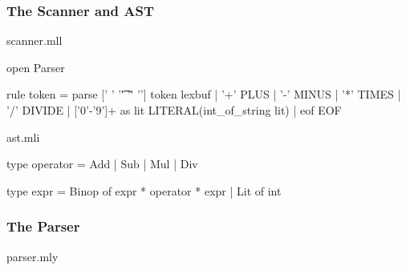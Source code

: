 \documentclass{plt}
\begin{document}
\begin{frame}[fragile]
  \frametitle{The Scanner and AST}
scanner.mll

\vspace{4pt}

\begin{ocamllex}
{ open Parser }

rule token =
  parse [' ' '\t' '\r' '\n'] { token lexbuf }
      | '+'                  { PLUS }
      | '-'                  { MINUS }
      | '*'                  { TIMES }
      | '/'                  { DIVIDE }
      | ['0'-'9']+ as lit    { LITERAL(int_of_string lit) }
      | eof                  { EOF }
\end{ocamllex}

\vspace{1pc}

ast.mli

\vspace{4pt}

\begin{ocaml}
type operator = Add | Sub | Mul | Div

type expr =
    Binop of expr * operator * expr
  | Lit of int
\end{ocaml}

\end{frame}

\begin{frame}[fragile]
  \frametitle{The Parser}

parser.mly

\vspace{4pt}

\end{frame}
\end{document}
